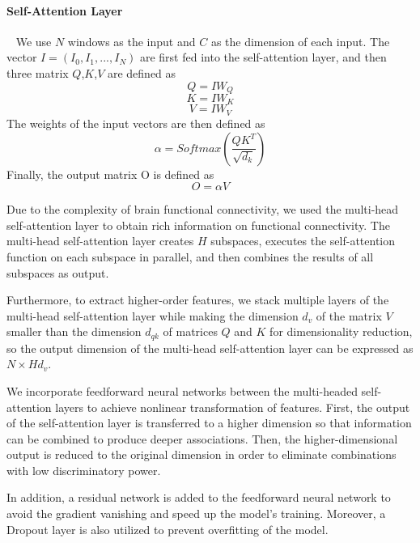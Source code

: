 \documentclass[a4paper]{cas-dc}
\begin{document}
\paragraph{Self-Attention Layer}~{}
\newline
\indent We use $N$ windows as the input and $C$ as the dimension of each input. The vector $I = (I_0, I_1,..., I_N)$ are first fed into the self-attention layer, and then three matrix $Q$,$K$,$V$ are defined as
\begin{equation}
	Q = IW_Q
\end{equation}
\begin{equation}
	K = IW_K
\end{equation}
\begin{equation}
	V = IW_V
\end{equation}
The weights of the input vectors are then defined as
\begin{equation}
	\alpha = Softmax(\frac{QK^T}{\sqrt{d_k}})
\end{equation}
Finally, the output matrix O is defined as
\begin{equation}
	O = \alpha V
\end{equation}

Due to the complexity of brain functional connectivity, we used the multi-head self-attention layer to obtain rich information on functional connectivity. The multi-head self-attention layer creates $H$ subspaces, executes the self-attention function on each subspace in parallel, and then combines the results of all subspaces as output.

Furthermore, to extract higher-order features, we stack multiple layers of the multi-head self-attention layer while making the dimension $d_v$ of the matrix $V$ smaller than the dimension $d_{qk}$ of matrices $Q$ and $K$ for dimensionality reduction, so the output dimension of the multi-head self-attention layer can be expressed as $N\times Hd_v$.

We incorporate feedforward neural networks between the multi-headed self-attention layers to achieve nonlinear transformation of features. First, the output of the self-attention layer is transferred to a higher dimension so that information can be combined to produce deeper associations. Then, the higher-dimensional output is reduced to the original dimension in order to eliminate combinations with low discriminatory power.

In addition, a residual network is added to the feedforward neural network to avoid the gradient vanishing and speed up the model's training. Moreover, a Dropout layer is also utilized to prevent overfitting of the model.
\end{document}
